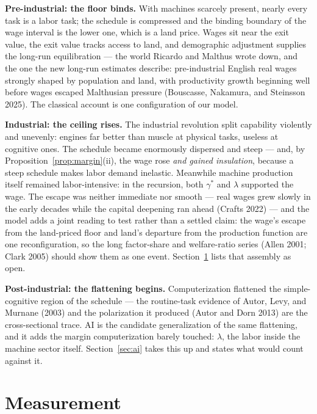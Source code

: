 \documentclass[12pt]{article}
\theoremstyle{plain}
\begin{document}
\textbf{Pre-industrial: the floor binds.} With machines scarcely present, nearly every task is a labor task; the schedule is compressed and the binding boundary of the wage interval is the lower one, which is a land price. Wages sit near the exit value, the exit value tracks access to land, and demographic adjustment supplies the long-run equilibration --- the world Ricardo and Malthus wrote down, and the one the new long-run estimates describe: pre-industrial English real wages strongly shaped by population and land, with productivity growth beginning well before wages escaped Malthusian pressure (Bouscasse, Nakamura, and Steinsson 2025). The classical account is one configuration of our model.

\textbf{Industrial: the ceiling rises.} The industrial revolution split capability violently and unevenly: engines far better than muscle at physical tasks, useless at cognitive ones. The schedule became enormously dispersed and steep --- and, by Proposition~\ref{prop:margin}(ii), the wage rose \emph{and gained insulation}, because a steep schedule makes labor demand inelastic. Meanwhile machine production itself remained labor-intensive: in the recursion, both $\gamma ^*$ and $\lambda$ supported the wage. The escape was neither immediate nor smooth --- real wages grew slowly in the early decades while the capital deepening ran ahead (Crafts 2022) --- and the model adds a joint reading to test rather than a settled claim: the wage's escape from the land-priced floor and land's departure from the production function are one reconfiguration, so the long factor-share and welfare-ratio series (Allen 2001; Clark 2005) should show them as one event. Section~\ref{sec:measurement} lists that assembly as open.

\textbf{Post-industrial: the flattening begins.} Computerization flattened the simple-cognitive region of the schedule --- the routine-task evidence of Autor, Levy, and Murnane (2003) and the polarization it produced (Autor and Dorn 2013) are the cross-sectional trace. AI is the candidate generalization of the same flattening, and it adds the margin computerization barely touched: $\lambda$, the labor inside the machine sector itself. Section~\ref{sec:ai} takes this up and states what would count against it.

\section{Measurement}\label{sec:measurement}
\end{document}
